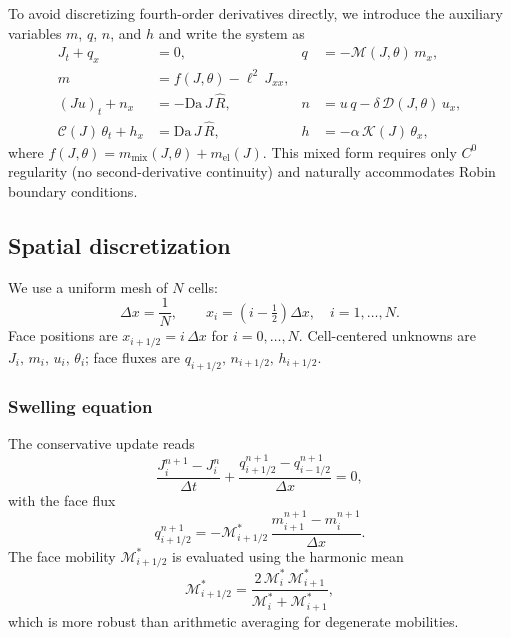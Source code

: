 \documentclass[aps,pre,reprint,superscriptaddress,longbibliography,floatfix]{revtex4-2}
\newcommand{\Ms}{\mathcal{M}}
\newcommand{\Ds}{\mathcal{D}}
\newcommand{\Cs}{\mathcal{C}}
\newcommand{\Ks}{\mathcal{K}}
\newcommand{\Da}{\mathrm{Da}}
\newcommand{\Rhat}{\widehat{R}}
\begin{document}
To avoid discretizing fourth-order derivatives directly, we introduce the auxiliary variables $m$, $q$, $n$, and $h$ and write the system as
\begin{align}
  J_t + q_x &= 0, & q &= -\Ms(J,\theta)\,m_x, \label{eq:mixed_J} \\
  m &= f(J,\theta) - \ell^2\,J_{xx}, \label{eq:mixed_m} \\
  (Ju)_t + n_x &= -\Da\,J\,\Rhat, & n &= u\,q - \delta\,\Ds(J,\theta)\,u_x, \label{eq:mixed_u} \\
  \Cs(J)\,\theta_t + h_x &= \Da\,J\,\Rhat, & h &= -\alpha\,\Ks(J)\,\theta_x, \label{eq:mixed_T}
\end{align}
where $f(J,\theta) = m_\mathrm{mix}(J,\theta) + m_\mathrm{el}(J)$. This mixed form requires only $C^0$ regularity (no second-derivative continuity) and naturally accommodates Robin boundary conditions.

\subsection{Spatial discretization}

We use a uniform mesh of $N$ cells:
\begin{equation}
  \Delta x = \frac{1}{N},
  \qquad
  x_i = \left(i - \tfrac{1}{2}\right)\Delta x,
  \quad i = 1,\dots,N.
  \label{eq:mesh}
\end{equation}
Face positions are $x_{i+1/2} = i\,\Delta x$ for $i=0,\dots,N$. Cell-centered unknowns are $J_i,\,m_i,\,u_i,\,\theta_i$; face fluxes are $q_{i+1/2},\,n_{i+1/2},\,h_{i+1/2}$.

\subsubsection{Swelling equation}

The conservative update reads
\begin{equation}
  \frac{J_i^{n+1} - J_i^{n}}{\Delta t}
  + \frac{q_{i+1/2}^{n+1} - q_{i-1/2}^{n+1}}{\Delta x} = 0,
  \label{eq:disc_J}
\end{equation}
with the face flux
\begin{equation}
  q_{i+1/2}^{n+1}
  = -\Ms_{i+1/2}^{*}\,
  \frac{m_{i+1}^{n+1} - m_i^{n+1}}{\Delta x}.
  \label{eq:disc_q}
\end{equation}
The face mobility $\Ms_{i+1/2}^{*}$ is evaluated using the harmonic mean
\begin{equation}
  \Ms_{i+1/2}^{*}
  = \frac{2\,\Ms_i^{*}\,\Ms_{i+1}^{*}}{\Ms_i^{*} + \Ms_{i+1}^{*}},
  \label{eq:harm_mean}
\end{equation}
which is more robust than arithmetic averaging for degenerate mobilities.
\end{document}
